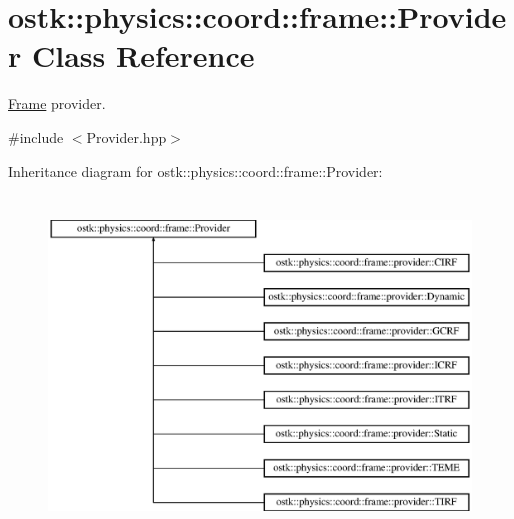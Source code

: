 \hypertarget{classostk_1_1physics_1_1coord_1_1frame_1_1_provider}{}\section{ostk\+:\+:physics\+:\+:coord\+:\+:frame\+:\+:Provider Class Reference}
\label{classostk_1_1physics_1_1coord_1_1frame_1_1_provider}


\hyperlink{classostk_1_1physics_1_1coord_1_1_frame}{Frame} provider.  




{\ttfamily \#include $<$Provider.\+hpp$>$}

Inheritance diagram for ostk\+:\+:physics\+:\+:coord\+:\+:frame\+:\+:Provider\+:\begin{figure}[H]
\begin{center}
\leavevmode
\includegraphics[height=9.000000cm]{classostk_1_1physics_1_1coord_1_1frame_1_1_provider}
\end{center}
\end{figure}
